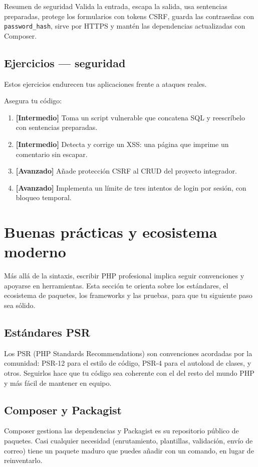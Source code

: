 \documentclass[11pt]{article}
\begin{document}
\begin{cajatip}{Resumen de seguridad}
Valida la entrada, escapa la salida, usa sentencias preparadas, protege los formularios con tokens CSRF, guarda las contraseñas con \texttt{password\_hash}, sirve por HTTPS y mantén las dependencias actualizadas con Composer.\par
\end{cajatip}
\subsection{Ejercicios — seguridad}
Estos ejercicios endurecen tus aplicaciones frente a ataques reales.

Asegura tu código:

\begin{enumerate}[leftmargin=1.7em,itemsep=3pt,topsep=2pt]
\item \textbf{[Intermedio]} Toma un script vulnerable que concatena SQL y reescríbelo con sentencias preparadas.
\item \textbf{[Intermedio]} Detecta y corrige un XSS: una página que imprime un comentario sin escapar.
\item \textbf{[Avanzado]} Añade protección CSRF al CRUD del proyecto integrador.
\item \textbf{[Avanzado]} Implementa un límite de tres intentos de login por sesión, con bloqueo temporal.
\end{enumerate}
\section{Buenas prácticas y ecosistema moderno}
Más allá de la sintaxis, escribir PHP profesional implica seguir convenciones y apoyarse en herramientas. Esta sección te orienta sobre los estándares, el ecosistema de paquetes, los frameworks y las pruebas, para que tu siguiente paso sea sólido.

\subsection{Estándares PSR}
Los PSR (PHP Standards Recommendations) son convenciones acordadas por la comunidad: PSR-12 para el estilo de código, PSR-4 para el autoload de clases, y otros. Seguirlos hace que tu código sea coherente con el del resto del mundo PHP y más fácil de mantener en equipo.

\subsection{Composer y Packagist}
Composer gestiona las dependencias y Packagist es su repositorio público de paquetes. Casi cualquier necesidad (enrutamiento, plantillas, validación, envío de correo) tiene un paquete maduro que puedes añadir con un comando, en lugar de reinventarlo.
\end{document}

